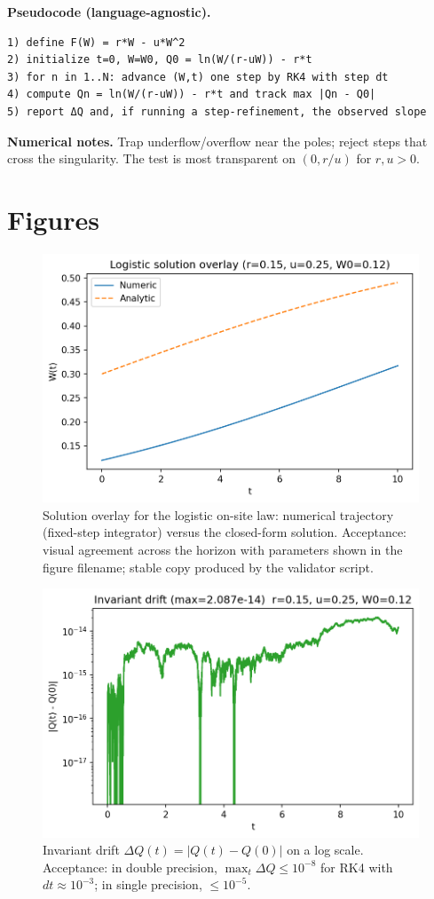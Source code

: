 \documentclass[11pt]{article}
\begin{document}
\textbf{Pseudocode (language-agnostic).}
\begin{verbatim}
1) define F(W) = r*W - u*W^2
2) initialize t=0, W=W0, Q0 = ln(W/(r-uW)) - r*t
3) for n in 1..N: advance (W,t) one step by RK4 with step dt
4) compute Qn = ln(W/(r-uW)) - r*t and track max |Qn - Q0|
5) report ΔQ and, if running a step-refinement, the observed slope
\end{verbatim}

\textbf{Numerical notes.}
Trap underflow/overflow near the poles; reject steps that cross the singularity. The test is most transparent on $(0,r/u)$ for $r,u>0$.

\section{Figures}

\begin{figure}[t]
\centering
\includegraphics[width=0.8\linewidth]{figs/qfum_solution_overlay.png}
\caption{Solution overlay for the logistic on-site law: numerical trajectory (fixed-step integrator) versus the closed-form solution. Acceptance: visual agreement across the horizon with parameters shown in the figure filename; stable copy produced by the validator script.}
\label{fig:fig_overlay}
\end{figure}

\begin{figure}[t]
\centering
\includegraphics[width=0.8\linewidth]{figs/qfum_Q_drift.png}
\caption{Invariant drift $\Delta Q(t)=|Q(t)-Q(0)|$ on a log scale. Acceptance: in double precision, $\max_t \Delta Q \le 10^{-8}$ for RK4 with $dt\approx 10^{-3}$; in single precision, $\le 10^{-5}$.}
\label{fig:fig_drift}
\end{figure}
\end{document}
